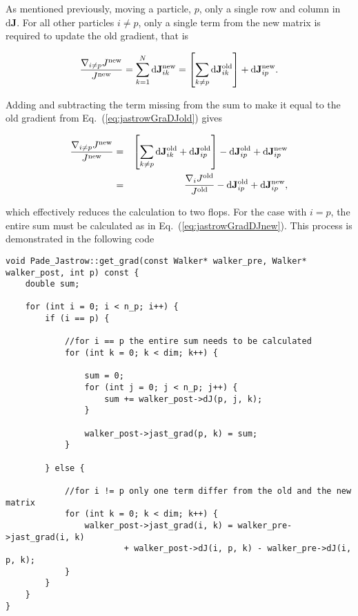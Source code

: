 As mentioned previously, moving a particle, $p$, only a single row and column in $\mathrm{d} \mathbf{J}$. For all other particles $i\ne p$, only a single term from the new matrix is required to update the old gradient, that is

\begin{equation}
 \frac{\nabla_{i\ne p} J^\mathrm{new}}{J^\mathrm{new}} = \sum_{k = 1}^N \mathrm{d}\mathbf{J}^\mathrm{new}_{ik} = \left[\sum_{k \ne p} \mathrm{d}\mathbf{J}^\mathrm{old}_{ik}\right] + \mathrm{d}\mathbf{J}^\mathrm{new}_{ip}.
\end{equation}

Adding and subtracting the term missing from the sum to make it equal to the old gradient from Eq.~(\ref{eq:jastrowGraDJold}) gives

\begin{eqnarray}
 \frac{\nabla_{i\ne p} J^\mathrm{new}}{J^\mathrm{new}} &=& \left[\sum_{k \ne p} \mathrm{d}\mathbf{J}^\mathrm{old}_{ik} + \mathrm{d}\mathbf{J}^\mathrm{old}_{ip}\right] - \mathrm{d}\mathbf{J}^\mathrm{old}_{ip} + \mathrm{d}\mathbf{J}^\mathrm{new}_{ip} \\
 &=& \frac{\nabla_i J^\mathrm{old}}{J^\mathrm{old}} - \mathrm{d}\mathbf{J}^\mathrm{old}_{ip} + \mathrm{d}\mathbf{J}^\mathrm{new}_{ip}, \label{eq:jastrowGradOptDJ}
\end{eqnarray}

which effectively reduces the calculation to two flops. For the case with $i=p$, the entire sum must be calculated as in Eq.~(\ref{eq:jastrowGradDJnew}). This process is demonstrated in the following code

\vspace{0.25cm}
\begin{lstlisting}[caption={The implementation of the Padé Jastrow gradient using the matrix from Eq.~(\ref{eq:jastrowDJ}). Lines 18-25 describe the case for gradients not equal to the moved particle, i.e.~Eq.~(\ref{eq:jastrowGradOptDJ}). Lines 5-18 describe the case for the gradient of the moved particle, where the full sum is calculated as in Eq.~(\ref{eq:jastrowGradDJnew}).}]
void Pade_Jastrow::get_grad(const Walker* walker_pre, Walker* walker_post, int p) const {
    double sum;

    for (int i = 0; i < n_p; i++) {
        if (i == p) {
       
            //for i == p the entire sum needs to be calculated
            for (int k = 0; k < dim; k++) {

                sum = 0;
                for (int j = 0; j < n_p; j++) {
                    sum += walker_post->dJ(p, j, k);
                }

                walker_post->jast_grad(p, k) = sum;
            }
        
        } else {
       
            //for i != p only one term differ from the old and the new matrix
            for (int k = 0; k < dim; k++) {
                walker_post->jast_grad(i, k) = walker_pre->jast_grad(i, k)
                        + walker_post->dJ(i, p, k) - walker_pre->dJ(i, p, k);
            }
        }
    }
}
\end{lstlisting}

